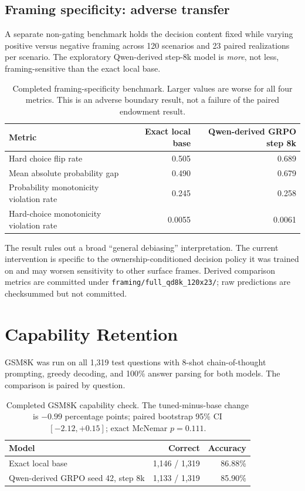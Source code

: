 \documentclass[11pt,letterpaper]{article}
\begin{document}
\subsection{Framing specificity: adverse transfer}

A separate non-gating benchmark holds the decision content fixed while varying
positive versus negative framing across 120 scenarios and 23 paired
realizations per scenario. The exploratory Qwen-derived step-8k model is
\emph{more}, not less, framing-sensitive than the exact local base.

\begin{table}[htbp]
\centering
\small
\begin{tabular}{lrr}
\toprule
Metric & Exact local base & Qwen-derived GRPO step 8k \\
\midrule
Hard choice flip rate & 0.505 & 0.689 \\
Mean absolute probability gap & 0.490 & 0.679 \\
Probability monotonicity violation rate & 0.245 & 0.258 \\
Hard-choice monotonicity violation rate & 0.0055 & 0.0061 \\
\bottomrule
\end{tabular}
\caption{Completed framing-specificity benchmark. Larger values are worse for
all four metrics. This is an adverse boundary result, not a failure of the
paired endowment result.}
\label{tab:framing}
\end{table}

The result rules out a broad ``general debiasing'' interpretation. The current
intervention is specific to the ownership-conditioned decision policy it was
trained on and may worsen sensitivity to other surface frames. Derived
comparison metrics are committed under
\texttt{framing/full\_qd8k\_120x23/}; raw predictions are checksummed but not
committed.

\FloatBarrier
\section{Capability Retention}

GSM8K \citep{cobbe2021gsm8k} was run on all 1,319 test questions with 8-shot
chain-of-thought prompting, greedy decoding, and 100\% answer parsing for both
models. The comparison is paired by question.

\begin{table}[htbp]
\centering
\small
\begin{tabular}{lrr}
\toprule
Model & Correct & Accuracy \\
\midrule
Exact local base & 1,146 / 1,319 & 86.88\% \\
Qwen-derived GRPO seed 42, step 8k & 1,133 / 1,319 & 85.90\% \\
\bottomrule
\end{tabular}
\caption{Completed GSM8K capability check. The tuned-minus-base change is
$-0.99$ percentage points; paired bootstrap 95\% CI
$[-2.12,+0.15]$; exact McNemar $p=0.111$.}
\label{tab:gsm8k}
\end{table}
\end{document}
